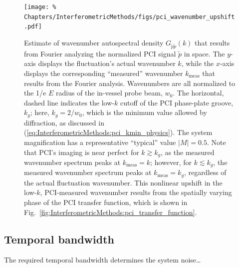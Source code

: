 \begin{figure}
  \centering
  \texttt{[image: \%
    Chapters/InterferometricMethods/figs/pci\_wavenumber\_upshift.pdf]}
    \caption[Nonlinear upshift in low-$k$, PCI-measured wavenumber]{%
    Estimate of wavenumber autospectral density $G_{\tilde{p}\tilde{p}}(k)$
    that results from Fourier analyzing
    the normalized PCI signal $\tilde{p}$ in space.
    The $y$-axis displays the fluctuation's actual wavenumber $k$, while
    the $x$-axis displays the corresponding ``measured'' wavenumber
    $k_{\text{meas}}$ that results from the Fourier analysis.
    Wavenumbers are all normalized
    to the 1/e $E$ radius of the in-vessel probe beam, $w_0$.
    The horizontal, dashed line indicates
    the low-$k$ cutoff of the PCI phase-plate groove, $k_g$;
    here, $k_g = 2 / w_0$,
    which is the minimum value allowed by diffraction,
    as discussed in
    (\ref{eq:InterferometricMethods:pci_kmin_physics}).
    The system magnification has
    a representative ``typical'' value $|M| = 0.5$.
    Note that PCI's imaging is near perfect for $k \gtrsim k_g$,
    as the measured wavenumber spectrum peaks at $k_{\text{meas}} = k$;
    however, for $k \lesssim k_g$,
    the measured wavenumber spectrum peaks at $k_{\text{meas}} = k_g$,
    regardless of the actual fluctuation wavenumber.
    This nonlinear upshift in the low-$k$, PCI-measured wavenumber
    results from the spatially varying phase
    of the PCI transfer function, which is shown in
    Fig.~\ref{fig:InterferometricMethods:pci_transfer_function}.
  }
\label{fig:InterferometricMethods:pci_wavenumber_upshift}
\end{figure}


\subsection{Temporal bandwidth}
The required temporal bandwidth determines the system noise\ldots




